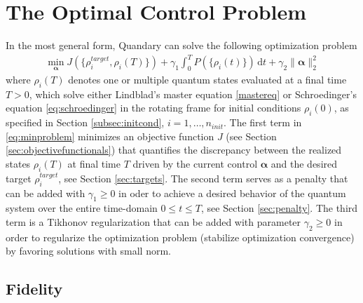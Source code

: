 \documentclass[11pt]{article}
\newcommand{\bfa}{\boldsymbol{\alpha}}
\begin{document}
\section{The Optimal Control Problem} \label{sec:optim}
In the most general form, Quandary can solve the following optimization problem
\begin{align}\label{eq:minproblem}
  \min_{\boldsymbol{\alpha}} J(\{\rho^{target}_i, \rho_i(T) \}) + \gamma_1 \int_0^T P\left(\{\rho_i(t)\}\right) \, \mathrm{d} t + \gamma_2 \| \bfa \|^2_2
\end{align}
where $\rho_i(T)$ denotes one or multiple quantum states evaluated at a final time $T>0$, which solve either Lindblad's master equation \eqref{mastereq} or Schroedinger's equation \eqref{eq:schroedinger} in the rotating frame for initial conditions $\rho_i(0)$, as specified in Section \ref{subsec:initcond}, $i=1,\dots, n_{init}$. The first term in \eqref{eq:minproblem} minimizes an objective function $J$ (see Section \ref{sec:objectivefunctionals}) that quantifies the discrepancy between the realized states $\rho_i(T)$ at final time $T$ driven by the current control $\boldsymbol{\alpha}$ and the desired target $\rho^{target}_i$, see Section \ref{sec:targets}. 
The second term serves as a penalty that can be added with $\gamma_1 \geq 0$ in oder to achieve a desired behavior of the quantum system over the entire time-domain $0\leq t\leq T$, see Section \ref{sec:penalty}. 
The third term is a Tikhonov regularization that can be added with parameter $\gamma_2\geq 0$ in order to regularize the optimization problem (stabilize optimization convergence) by favoring solutions with small norm. 

\subsection{Fidelity}\label{sec:fidelity}
\end{document}
